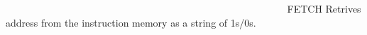 ~\newline
~\newline
~\newline
~\newline
~\newline
~\newline
~\newline
~\newline
~\newline
~\newline
~\newline
~\newline
~\newline
~\newline
~\newline
~\newline
~\newline
~\newline
~\newline
~\newline
~\newline
~\newline
~\newline
~\newline
~\newline
~\newline
~\newline
~\newline
~\newline
~\newline
~\newline
~\newline
~\newline
~\newline
 F\+E\+T\+CH Retrives address from the instruction memory as a string of 1s/0s. ~\newline
~\newline
~\newline
~\newline
~\newline
~\newline
~\newline
~\newline
~\newline
~\newline
~\newline
~\newline
~\newline
~\newline
~\newline
~\newline
~\newline
